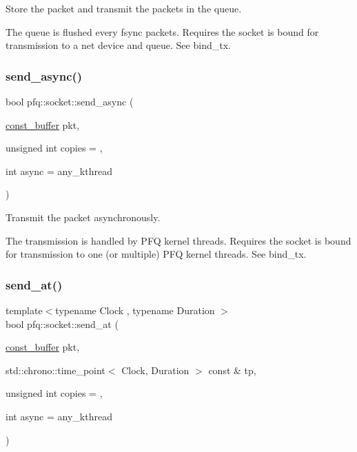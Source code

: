 Store the packet and transmit the packets in the queue. 

The queue is flushed every fsync packets. Requires the socket is bound for transmission to a net device and queue. See \textquotesingle{}bind\+\_\+tx\textquotesingle{}. \mbox{\label{classpfq_1_1socket_a7aabeecfa3112bc2b2fa54ac6a59357a}} 
\subsubsection{\texorpdfstring{send\+\_\+async()}{send\_async()}}
{\footnotesize\ttfamily bool pfq\+::socket\+::send\+\_\+async (\begin{DoxyParamCaption}\item[{\hyperlink{namespacepfq_ac835a1bd09b4cbaba61c100b50d0a99f}{const\+\_\+buffer}}]{pkt,  }\item[{unsigned int}]{copies = {},  }\item[{int}]{async = {\ttfamily any\+\_\+kthread} }\end{DoxyParamCaption})\hspace{0.3cm}{\ttfamily [inline]}}



Transmit the packet asynchronously. 

The transmission is handled by P\+FQ kernel threads. Requires the socket is bound for transmission to one (or multiple) P\+FQ kernel threads. See \textquotesingle{}bind\+\_\+tx\textquotesingle{}. \mbox{\label{classpfq_1_1socket_aeaaf63387599e9bb3d7d03258f125513}} 
\subsubsection{\texorpdfstring{send\+\_\+at()}{send\_at()}}
{\footnotesize\ttfamily template$<$typename Clock , typename Duration $>$ \\
bool pfq\+::socket\+::send\+\_\+at (\begin{DoxyParamCaption}\item[{\hyperlink{namespacepfq_ac835a1bd09b4cbaba61c100b50d0a99f}{const\+\_\+buffer}}]{pkt,  }\item[{std\+::chrono\+::time\+\_\+point$<$ Clock, Duration $>$ const \&}]{tp,  }\item[{unsigned int}]{copies = {},  }\item[{int}]{async = {\ttfamily any\+\_\+kthread} }\end{DoxyParamCaption})\hspace{0.3cm}{\ttfamily [inline]}}

